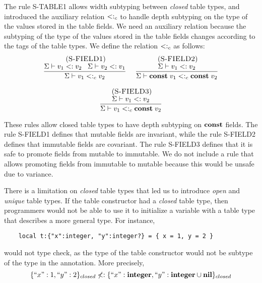 The rule \textsc{S-TABLE1} allows width subtyping between \emph{closed}
table types, and introduced the auxiliary relation $<:_{c}$ to
handle depth subtyping on the type of the values stored in the table fields.
We need an auxiliary relation because the subtyping of the
type of the values stored in the table fields changes according to
the tags of the table types.
We define the relation $<:_{c}$ as follows:
\[
\begin{array}{c}
\begin{array}{c}
\; (\textsc{S-FIELD1})\\
\dfrac{\Sigma \vdash v_{1} <: v_{2} \;\;\;
       \Sigma \vdash v_{2} <: v_{1}}
      {\Sigma \vdash v_{1} <:_{c} v_{2}}
\end{array}
\;
\begin{array}{c}
\; (\textsc{S-FIELD2})\\
\dfrac{\Sigma \vdash v_{1} <: v_{2}}
      {\Sigma \vdash \mathbf{const} \; v_{1} <:_{c} \mathbf{const} \; v_{2}}
\end{array}
\\ \\
\begin{array}{c}
\; (\textsc{S-FIELD3})\\
\dfrac{\Sigma \vdash v_{1} <: v_{2}}
      {\Sigma \vdash v_{1} <:_{c} \mathbf{const} \; v_{2}}
\end{array}
\end{array}
\]

These rules allow closed table types to have depth subtyping on $\mathbf{const}$ fields.
The rule \textsc{S-FIELD1} defines that mutable fields are invariant,
while the rule \textsc{S-FIELD2} defines that immutable fields are covariant.
The rule \textsc{S-FIELD3} defines that it is safe to promote fields
from mutable to immutable.
We do not include a rule that allows promoting fields from immutable
to mutable because this would be unsafe due to variance.

There is a limitation on \emph{closed} table types that led us to
introduce \emph{open} and \emph{unique} table types.
If the table constructor had a \emph{closed} table type, then
programmers would not be able to use it to initialize a variable with
a table type that describes a more general type.
For instance,
\begin{verbatim}
    local t:{"x":integer, "y":integer?} = { x = 1, y = 2 }
\end{verbatim}
would not type check, as the type of the table constructor would not
be subtype of the type in the annotation.
More precisely,
\[
\{``x":1, ``y":2\}_{closed} \not<: \{``x":\mathbf{integer}, ``y":\mathbf{integer} \cup \mathbf{nil}\}_{closed}
\]

